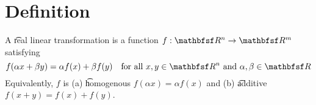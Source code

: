 
\section*{Definition}

A \t{real linear transformation} is a function $f: \R ^n \to \R ^m$ satisfying
\[
f(\alpha x + \beta y) = \alpha f(x) + \beta f(y) \quad \text{for all } x, y \in \R ^n \text{ and } \alpha , \beta  \in \R
\]
Equivalently, $f$ is (a) \t{homogenous} $f(\alpha x) = \alpha f(x)$ and (b) \t{additive} $f(x + y)= f(x) + f(y)$.

\blankpage